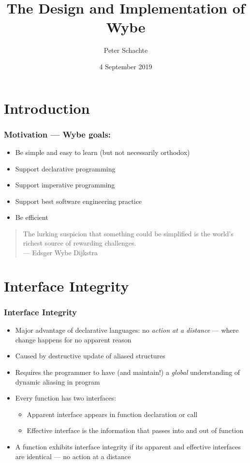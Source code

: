 \documentclass[12pt]{beamer}
\title[Introducing Wybe]{The Design and Implementation of Wybe}
\author[Peter Schachte]
{Peter Schachte}
\institute[Melbourne Uni]{The University of Melbourne \\ School of
  Computing and Information Systems}
\date{4 September 2019}
\begin{document}
\frame{\titlepage}

\section{Introduction}

\begin{frame}[fragile]
\frametitle{Motivation --- Wybe goals:}
\begin{itemize}
\item Be simple and easy to learn (but not necessarily orthodox)
\item Support declarative programming
\item Support imperative programming
\item Support best software engineering practice
\item Be efficient
\end{itemize}
\vspace{2ex}
\begin{quote}
  The lurking suspicion that something could be simplified is the
world's richest source of rewarding challenges. \\
\hspace*{1cm} --- Edsger Wybe Dijkstra
\end{quote}
\end{frame}

\section{Interface Integrity}

\begin{frame}[fragile]
\frametitle{Interface Integrity}
\begin{itemize}
\item Major advantage of declarative languages:  
  no \emph{action at a distance} --- where change happens for no apparent reason
\item Caused by destructive update of aliased structures
\item Requires the programmer to have (and maintain!) a \emph{global}
  understanding of dynamic aliasing in program
\item Every function has two interfaces:
  \begin{itemize}
  \item \alert<2>{Apparent interface} appears in function declaration
    or call
  \item \alert<3>{Effective interface} is the information that passes into and out of function
  \end{itemize}
\item A function exhibits \alert<4>{interface integrity} if its apparent and
effective interfaces are identical --- no action at a distance

\end{itemize}

\end{frame}
\end{document}
